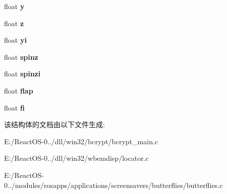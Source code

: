 \begin{DoxyCompactItemize}
float {\bfseries y}
\item 
\mbox{\label{structobject_ae2834c7a2034bfdd40ac7f9802e75141}} 
float {\bfseries z}
\item 
\mbox{\label{structobject_a2136850c33d6e2be7c774ca22accab18}} 
float {\bfseries yi}
\item 
\mbox{\label{structobject_a41926d5cbef23a80f91399dfa2d8f505}} 
float {\bfseries spinz}
\item 
\mbox{\label{structobject_a5d927e51c191f2944802ab1645816040}} 
float {\bfseries spinzi}
\item 
\mbox{\label{structobject_a1c94e12c9fe5ea7a31aa98e1da667564}} 
float {\bfseries flap}
\item 
\mbox{\label{structobject_a9ca57ce8fdbfbc35555f0a976930d0ac}} 
float {\bfseries fi}
\end{DoxyCompactItemize}


该结构体的文档由以下文件生成\+:\begin{DoxyCompactItemize}
\item 
E\+:/\+React\+O\+S-\/0../dll/win32/bcrypt/bcrypt\+\_\+main.\+c\item 
E\+:/\+React\+O\+S-\/0../dll/win32/wbemdisp/locator.\+c\item 
E\+:/\+React\+O\+S-\/0../modules/rosapps/applications/screensavers/butterflies/butterflies.\+c\end{DoxyCompactItemize}
